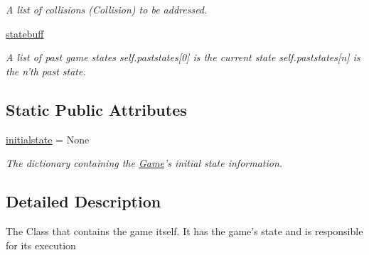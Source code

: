 \begin{DoxyCompactItemize}
\begin{DoxyCompactList}\small\item\em \-A list of collisions (\-Collision) to be addressed. \end{DoxyCompactList}\item 
\hypertarget{classGame_1_1Game_a98127da75f494b585a5ee33f99c75823}{\hyperlink{classGame_1_1Game_a98127da75f494b585a5ee33f99c75823}{statebuff}}\label{classGame_1_1Game_a98127da75f494b585a5ee33f99c75823}

\begin{DoxyCompactList}\small\item\em \-A list of past game states self.\-paststates\mbox{[}0\mbox{]} is the current state self.\-paststates\mbox{[}n\mbox{]} is the n'th past state. \end{DoxyCompactList}\end{DoxyCompactItemize}
\subsection*{\-Static \-Public \-Attributes}
\begin{DoxyCompactItemize}
\item 
\hypertarget{classGame_1_1Game_a71a6e20de6b0164b8262d44ba73449e6}{\hyperlink{classGame_1_1Game_a71a6e20de6b0164b8262d44ba73449e6}{initialstate} = \-None}\label{classGame_1_1Game_a71a6e20de6b0164b8262d44ba73449e6}

\begin{DoxyCompactList}\small\item\em \-The dictionary containing the \hyperlink{classGame_1_1Game}{\-Game}'s initial state information. \end{DoxyCompactList}\end{DoxyCompactItemize}


\subsection{\-Detailed \-Description}
\begin{DoxyVerb}The Class that contains the game itself.
It has the game's state and is responsible for its execution
\end{DoxyVerb}
 


